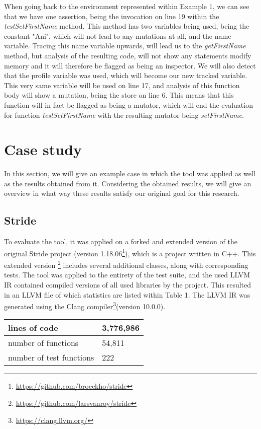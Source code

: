 \documentclass[11pt]{article}
\begin{document}
\begin{multicols}{2}
When going back to the environment represented within Example 1, we can see that we have one assertion, being the invocation on line 19 within the \textit{testSetFirstName} method. This method has two variables being used, being the constant "Ani", which will not lead to any mutations at all, and the name variable. Tracing this name variable upwards, will lead us to the \textit{getFirstName} method, but analysis of the resulting code, will not show any  statements modify memory and it will therefore be flagged as being an inspector. We will also detect that the profile variable was used, which will become our new tracked variable. This very same variable will be used on line 17, and analysis of this function body will show a mutation, being the store on line 6. This means that this function will in fact be flagged as being a mutator, which will end the evaluation for function \textit{testSetFirstName} with the resulting mutator being \textit{setFirstName}.

\section{Case study}
In this section, we will give an example case in which the tool was applied as well as the results obtained from it. Considering the obtained results, we will give an overview in what way these results satisfy our original goal for this research.

\subsection{Stride}
To evaluate the tool, it was applied on a forked and extended version of the original Stride project (version 1.18.06\footnote{\url{https://github.com/broeckho/stride}}), which is a project written in C++. This extended version \footnote{\url{https://github.com/larsvanroy/stride}} includes several additional classes, along with corresponding tests. The tool was applied to the entirety of the test suite, and the used LLVM IR contained compiled versions of all used libraries by the project. This resulted in an LLVM file of which statistics are listed within Table 1. The LLVM IR was generated using the Clang compiler\footnote{\url{https://clang.llvm.org/}}(version 10.0.0).

\begin{center}
	\begin{tabular}{ |p{4.5cm}|p{2.5cm}|  }
		\hline
		lines of code & 3,776,986\\
		\hline
		number of functions   & 54,811\\
		\hline
		number of test functions &   222\\
		\hline
	\end{tabular}
\end{center}


\end{multicols}
\end{document}
